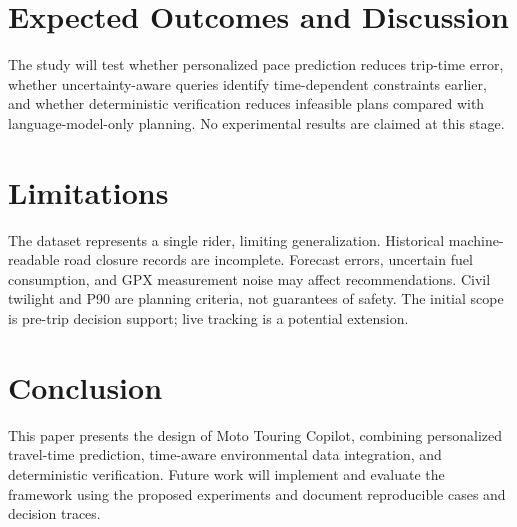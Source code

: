 \section{Expected Outcomes and Discussion}
The study will test whether personalized pace prediction reduces trip-time error, whether uncertainty-aware queries identify time-dependent constraints earlier, and whether deterministic verification reduces infeasible plans compared with language-model-only planning. No experimental results are claimed at this stage.
\section{Limitations}
The dataset represents a single rider, limiting generalization. Historical machine-readable road closure records are incomplete. Forecast errors, uncertain fuel consumption, and GPX measurement noise may affect recommendations. Civil twilight and P90 are planning criteria, not guarantees of safety. The initial scope is pre-trip decision support; live tracking is a potential extension.
\section{Conclusion}
This paper presents the design of Moto Touring Copilot, combining personalized travel-time prediction, time-aware environmental data integration, and deterministic verification. Future work will implement and evaluate the framework using the proposed experiments and document reproducible cases and decision traces.
